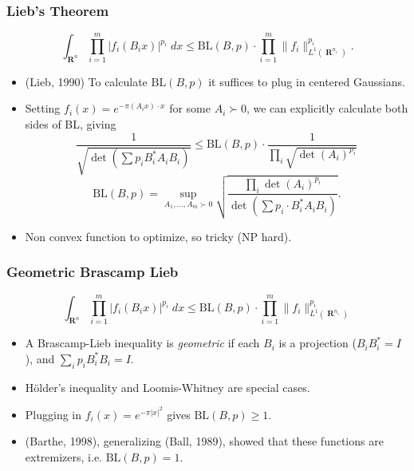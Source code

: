 \documentclass[usenames,dvipsnames,12pt]{beamer}
\DeclareMathOperator{\RR}{\mathbf{R}}
\begin{document}
\begin{frame}
    \frametitle{Lieb's Theorem}

    \vspace{-1.5em}
    \[ \int_{\RR^n} \prod_{i = 1}^m |f_i(B_i x)|^{p_i}\; dx \leq \text{BL}(B,p) \cdot \prod_{i=1}^m \| f_i \|_{L^1(\RR^{n_i})}^{p_i}.  \]

    \begin{itemize}
        \pause
        \item (Lieb, 1990) To calculate $\text{BL}(B,p)$ it suffices to plug in centered Gaussians.

        \pause
        \item Setting $f_i(x) = e^{- \pi (A_i x) \cdot x}$ for some $A_i \succ 0$, we can explicitly calculate both sides of BL, giving
        \[ \frac{1}{\sqrt{ \det(\sum p_i B_i^* A_i B_i ) }} \leq \text{BL}(B,p) \cdot \frac{1}{\prod_i \sqrt{\det(A_i)^{p_i}}} \]
        \[ \text{BL}(B,p) = \sup_{A_1,\dots,A_m \succ 0} \sqrt{ \frac{\prod_i \det(A_i)^{p_i}}{\det(\sum p_i \cdot B_i^* A_i B_i)}}. \]

        \pause
        \item Non convex function to optimize, so tricky (NP hard).
    \end{itemize}
\end{frame}

\begin{frame}
    \frametitle{Geometric Brascamp Lieb}

    \vspace{-1.5em}
    \[ \int_{\RR^n} \prod_{i = 1}^m |f_i(B_i x)|^{p_i}\; dx \leq \text{BL}(B,p) \cdot \prod_{i = 1}^m \| f_i \|_{L^1(\RR^{n_i})}^{p_i} \]

    \begin{itemize}
        \pause
        \item A Brascamp-Lieb inequality is \emph{geometric} if each $B_i$ is a projection ($B_i B_i^* = I$), and $\sum_i p_i B_i^* B_i = I$.

        \pause
        \item H\"{o}lder's inequality and Loomis-Whitney are special cases.

        \pause
        \item Plugging in $f_i(x) = e^{-\pi |x|^2}$ gives $\text{BL}(B,p) \geq 1$.

        \pause
        \item (Barthe, 1998), generalizing (Ball, 1989), showed that these functions are extremizers, i.e. $\text{BL}(B,p) = 1$.
    \end{itemize}
\end{frame}
\end{document}
